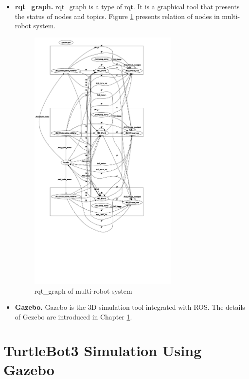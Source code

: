 \begin{itemize}
    \item \textbf{rqt\_graph.} rqt\_graph is a type of rqt. It is a graphical tool that presents the status of nodes and topics. Figure \ref{fig:rqt_graph} presents relation of nodes in multi-robot system.
    \begin{figure}[htbp]
        \centering
        \includegraphics[width = 0.7\textwidth]{content/images/ch2/rosgraph.png}
        \caption{rqt\_graph of multi-robot system}
        \label{fig:rqt_graph}
    \end{figure}

    \item \textbf{Gazebo.} Gazebo \cite{GZ} is the 3D simulation tool integrated with ROS. The details of Gezebo are introduced in Chapter \ref{sec:modeling_gazebo}.
\end{itemize}

\section{TurtleBot3 Simulation Using Gazebo}
\label{sec:modeling_gazebo}

